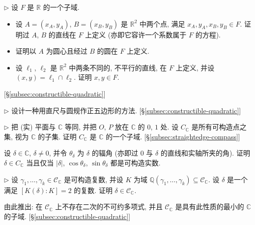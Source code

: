 \begin{prob}\label{ex:lines-circles-over-F}
$\triangleright$ 设 $F$ 是 $\mathbb{R}$ 的一个子域.
\begin{itemize}
\item 设 $A=(x_A,y_A)$, $B=(x_B,y_B)$ 是 $\mathbb{R}^2$ 中两个点, 满足 $x_A,y_A,x_B,y_B\in F$. 证明过 $A$, $B$ 的直线在 $F$ 上定义 (亦即它容许一个系数属于 $F$ 的方程).
\item 证明以 $A$ 为圆心且经过 $B$ 的圆在 $F$ 上定义.
\item 设 $\ell_1$, $\ell_2$ 是 $\mathbb{R}^2$ 中两条不同的, 不平行的直线, 在 $F$ 上定义, 并设 $(x,y)=\ell_1\cap\ell_2$. 证明 $x,y\in F$.
\end{itemize}
[§\ref{subsec:constructible-quadratic}]
\end{prob}

\begin{prob}\label{ex:pentagon-construction}
$\triangleright$ 设计一种用直尺与圆规作正五边形的方法. [§\ref{subsec:constructible-quadratic}]
\end{prob}

\begin{prob}\label{ex:constructible-subfield-C}
$\triangleright$ 把 (实) 平面与 $\mathbb{C}$ 等同, 并把 $O$, $P$ 放在 $\mathbb{C}$ 的 $0$, $1$ 处. 设 $C_{\mathbb{C}}$ 是所有可构造点之集, 视为 $\mathbb{C}$ 的子集. 证明 $C_{\mathbb{C}}$ 是 $\mathbb{C}$ 的一个子域. [§\ref{subsec:straightedge-compass}]
\end{prob}

\begin{prob}\label{ex:constructible-modulus-arg}
设 $\delta\in\mathbb{C}$, $\delta\neq 0$, 并令 $\theta_{\delta}$ 为 $\delta$ 的辐角 (亦即过 $0$ 与 $\delta$ 的直线和实轴所夹的角). 证明 $\delta\in C_{\mathbb{C}}$ 当且仅当 $|\delta|$, $\cos\theta_{\delta}$, $\sin\theta_{\delta}$ 都是可构造实数.
\end{prob}

\begin{prob}\label{ex:complex-quadratic-constructible}
$\triangleright$ 设 $\gamma_1,\ldots,\gamma_k\in\mathcal{C}_{\mathbb{C}}$ 是可构造复数, 并设 $K$ 为域 $\mathbb{Q}(\gamma_1,\ldots,\gamma_k)\subseteq\mathcal{C}_{\mathbb{C}}$. 设 $\delta$ 是一个满足 $[K(\delta):K]=2$ 的复数. 证明 $\delta\in\mathcal{C}_{\mathbb{C}}$.

由此推出: 在 $\mathcal{C}_{\mathbb{C}}$ 上不存在二次的不可约多项式, 并且 $\mathcal{C}_{\mathbb{C}}$ 是具有此性质的最小的 $\mathbb{C}$ 的子域. [§\ref{subsec:constructible-quadratic}]
\end{prob}

